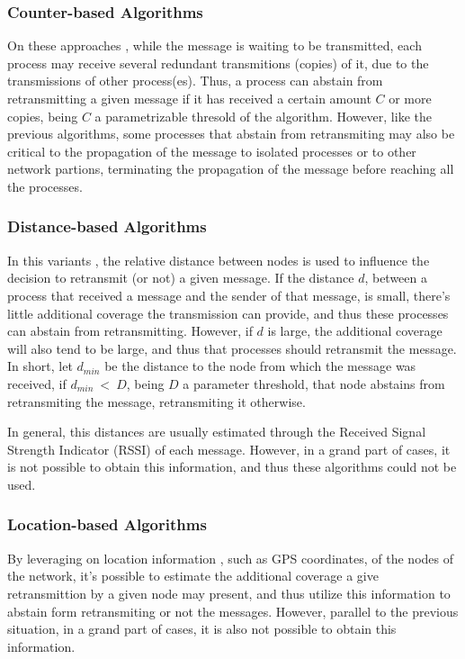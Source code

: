 \documentclass[conference]{IEEEtran}
\begin{document}
\subsubsection{Counter-based Algorithms} 
On these approaches \cite{probabilistic1,broadcaststorm,counterbcast}, while the message is waiting to be transmitted, each process may receive several redundant transmitions (copies) of it, due to the transmissions of other process(es). Thus, a process can abstain from retransmitting a given message if it has received a certain amount $C$ or more copies, being $C$ a parametrizable thresold of the algorithm. However, like the previous algorithms, some processes that abstain from retransmiting may also be critical to the propagation of the message to isolated processes or to other network partions, terminating the propagation of the message before reaching all the processes.

\subsubsection{Distance-based Algorithms}
In this variants \cite{pampa}, the relative distance between nodes is used to influence the decision to retransmit (or not) a given message. If the distance $d$, between a process that received a message and the sender of that message, is small, there's little additional coverage the transmission can provide, and thus these processes can abstain from retransmitting. However, if $d$ is large, the additional coverage will also tend to be large, and thus that processes should retransmit the message. In short, let $d_{min}$ be the distance to the node from which the message was received, if $d_{min}~<~D$, being $D$ a parameter threshold, that node abstains from retransmiting the message, retransmiting it otherwise.

In general, this distances are usually estimated through the Received Signal Strength Indicator (RSSI) of each message. However, in a grand part of cases, it is not possible to obtain this information, and thus these algorithms could not be used.

\subsubsection{Location-based Algorithms} 
By leveraging on location information \cite{locationbcast}, such as GPS coordinates, of the nodes of the network, it's possible to estimate the additional coverage a give retransmittion by a given node may present, and thus utilize this information to abstain form retransmiting or not the messages.
However, parallel to the previous situation, in a grand part of cases, it is also not possible to obtain this information.
\end{document}
